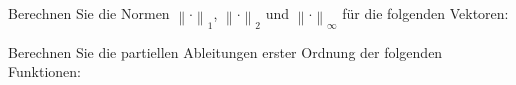 \documentclass[answers]{exam}
\newcommand{\norm}[1]{\left\| #1 \right\|}
\newcommand{\vektor}[1]{\begin{pmatrix*}[r] #1 \end{pmatrix*}}
\begin{document}
\begin{questions}
    \newpage
    \question
    Berechnen Sie die Normen $\norm{\cdot}_1$, $\norm{\cdot}_2$ und $\norm{\cdot}_\infty$ für die folgenden Vektoren:

    \newpage
    \question
    Berechnen Sie die partiellen Ableitungen erster Ordnung der folgenden Funktionen:
\end{questions}
\end{document}
